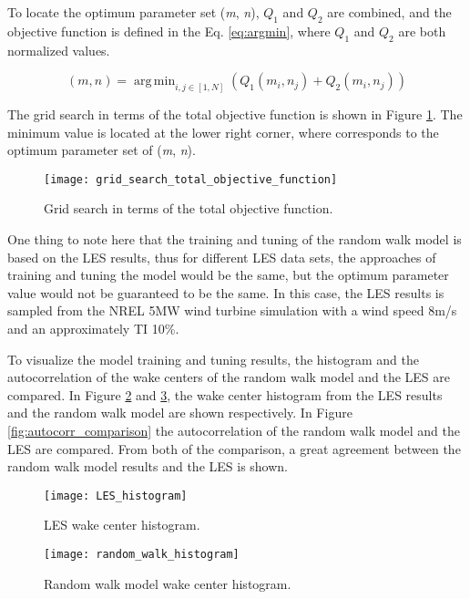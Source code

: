 \documentclass{umthesis}
\DeclareMathOperator*{\argmin}{arg\,min} %
\begin{document}
To locate the optimum parameter set (\textit{m}, \textit{n}), $Q_1$ and $Q_2$ are combined, and the objective function is defined in the Eq. \ref{eq:argmin}, where $Q_1$ and $Q_2$ are both normalized values.

\begin{equation}\label{eq:argmin}
  (m,n) = \argmin_{i,j\in[1,N]} (Q_1(m_i,n_j) + Q_2(m_i,n_j))
\end{equation}

The grid search in terms of the total objective function is shown in Figure \ref{fig:objective}. The minimum value is located at the lower right corner, where corresponds to the optimum parameter set of (\textit{m}, \textit{n}).

\begin{figure}
  \centering
  \texttt{[image: grid\_search\_total\_objective\_function]}
  \caption{Grid search in terms of the total objective function.}\label{fig:objective}
\end{figure}

One thing to note here that the training and tuning of the random walk model is based on the LES results, thus for different LES data sets, the approaches of training and tuning the model would be the same, but the optimum parameter value would not be guaranteed to be the same. In this case, the LES results is sampled from the NREL 5MW wind turbine simulation with a wind speed 8m/s and an approximately TI 10\%.

To visualize the model training and tuning results, the histogram and the autocorrelation of the wake centers of the random walk model and the LES are compared. In Figure \ref{fig:les_hist} and \ref{fig:rw_hist}, the wake center histogram from the LES results and the random walk model are shown respectively. In Figure \ref{fig:autocorr_comparison} the autocorrelation of the random walk model and the LES are compared. From both of the comparison, a great agreement between the random walk model results and the LES is shown.

\begin{figure}
  \centering
  \texttt{[image: LES\_histogram]}
  \caption{LES wake center histogram.}\label{fig:les_hist}
\end{figure}

\begin{figure}
  \centering
  \texttt{[image: random\_walk\_histogram]}
  \caption{Random walk model wake center histogram.}\label{fig:rw_hist}
\end{figure}
\end{document}
